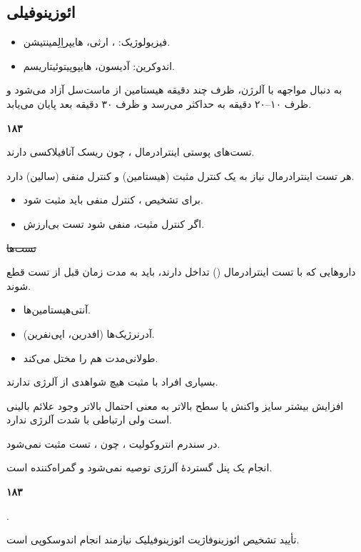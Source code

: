 \subsection*{ ائوزینوفیلی}
\begin{itemize}
\item فیزیولوژیک: ، ارثی، هایپراِلِمینتیشن.
\item اندوکرین: آدیسون، هایپوپیتوئیتاریسم.
\end{itemize}
به دنبال مواجهه با آلرژن، ظرف چند دقیقه هیستامین از ماست‌سل آزاد می‌شود و ظرف ۱۰--۲۰ دقیقه به حداکثر می‌رسد و ظرف ۳۰ دقیقه بعد پایان می‌یابد.

\noindent\textbf{۱۸۳}\par
تست‌های پوستی اینترادرمال ، چون ریسک آنافیلاکسی دارند.

هر تست اینترادرمال نیاز به یک کنترل مثبت (هیستامین) و کنترل منفی (سالین) دارد.
\begin{itemize}
\item برای تشخیص ، کنترل منفی باید مثبت شود.
\item اگر کنترل مثبت، منفی شود تست بی‌ارزش.
\end{itemize}
\sout{تست‌ها}
\par
داروهایی که با تست اینترادرمال () تداخل دارند، باید به مدت زمان  قبل از تست قطع شوند.
\begin{itemize}
\item آنتی‌هیستامین‌ها.
\item آدرنرژیک‌ها (افدرین، اپی‌نفرین).
\item {} طولانی‌مدت هم  را مختل می‌کند.
\end{itemize}
بسیاری افراد با  مثبت هیچ شواهدی از آلرژی ندارند.

افزایش بیشتر سایز واکنش  یا سطح بالاتر  به معنی احتمال بالاتر وجود علائم بالینی است ولی ارتباطی با شدت آلرژی ندارد.

در سندرم انتروکولیت ، چون ، تست  مثبت نمی‌شود.

انجام یک پنل گستردهٔ آلرژی توصیه نمی‌شود و گمراه‌کننده است.

\noindent\textbf{۱۸۳}\par
{}.

تأیید تشخیص ائوزینوفاژیت ائوزینوفیلیک نیازمند انجام اندوسکوپی است.
\endgroup

